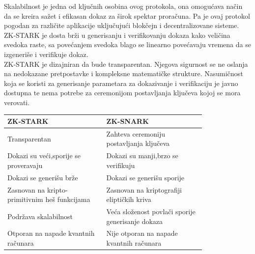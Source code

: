     Skalabilnost je jedna od klju\v cnih osobina ovog protokola, ona omogu\' cava na\v cin da se kreira sa\v zet i efikasan dokaz za \v sirok spektar prora\v cuna. Pa je ovaj protokol pogodan za razli\v cite aplikacije uklju\v cuju\' ci blokčejn i decentralizovane sisteme. \textenglish{ZK-STARK} je dosta br\v zi u generisanju i verifikovanju dokaza kako veli\v cina svedoka raste, sa pove\' canjem svedoka blago se linearno pove\' cavaju vremena da se izgeneri\v se i verifikuje dokaz.\\
    
    \textenglish{ZK-STARK} je dizajniran da bude transparentan. Njegova sigurnost se ne oslanja na nedokazane pretpostavke i kompleksne matemati\v cke strukture. Nasumi\v cnost koja se koristi za generisanje parametara za dokazivanje i verifikaciju je javno dostupna te nema potrebe za ceremonijom postavljanja klju\v ceva kojoj se mora verovati. 
    
\begin{center}
	\begin{tabular}{ |p{0.4\linewidth}|p{0.4\linewidth}| } 
		\hline 
		\textenglish{ZK-STARK}  & \textenglish{ZK-SNARK}  \\ 
		\hline \hline
		Transparentan & Zahteva ceremoniju \newline postavljanja ključeva \\ \hline
		Dokazi su veći,\newline sporije se proveravaju & Dokazi su manji,\newline brzo se verifikuju \\ \hline
		Dokazi se generišu brže & Dokazi se generišu sporije \\ \hline
		Zasnovan na kripto-\newline primitivnim heš funkcijama & Zasnovan na kriptografiji eliptičkih kriva  \\ \hline
		Podržava skalabilnost & Veća složenost povlači sporije generisanje dokaza\\ \hline
		Otporan na napade \newline kvantnih računara & Nije otporan na napade \newline kvantnih računara\\ 
		\hline
	\end{tabular}
\end{center}
    
